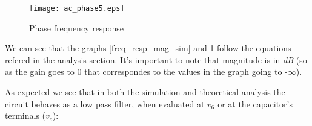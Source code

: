 \begin{figure}[H]
  \centering
  \texttt{[image: ac\_phase5.eps]}
  \caption{Phase frequency response}
  \label{freq_resp_pha_sim}
\end{figure}

We can see that the graphs \ref{freq_resp_mag_sim} and \ref{freq_resp_pha_sim} follow the equations refered in the analysis section. It's important to note that magnitude is in \emph{dB} (so as the gain goes to 0 that correspondes to the values in the graph going to -$\infty$).

As expected we see that in both the simulation and theoretical analysis the circuit behaves as a low pass filter, when evaluated at $v_6$ or at the capacitor's terminals ($v_c$):	
